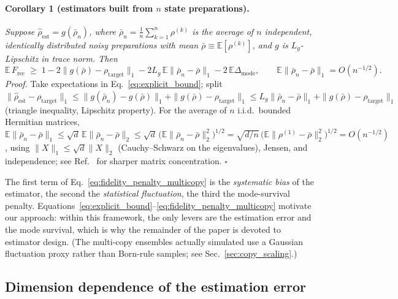 \documentclass[12pt,a4paper]{article}
\newcommand{\Frec}{F_\mathrm{rec}}
\newcommand{\rhot}{\rho_\mathrm{target}}
\newcommand{\rhoe}{\hat{\rho}_\mathrm{est}}
\begin{document}
\paragraph{Corollary 1 (estimators built from $n$ state preparations).}
\textit{Suppose $\rhoe = g(\bar\rho_n)$, where $\bar\rho_n = \tfrac1n\sum_{k=1}^n \rho^{(k)}$ is the average of $n$ independent, identically distributed noisy preparations with mean $\bar\rho \equiv \mathbb{E}[\rho^{(k)}]$, and $g$ is $L_g$-Lipschitz in trace norm. Then}
\begin{equation}
\mathbb{E}\,\Frec \;\geq\; 1 - 2\bigl\|g(\bar\rho) - \rhot\bigr\|_1 - 2L_g\,\mathbb{E}\|\bar\rho_n - \bar\rho\|_1 - 2\,\mathbb{E}\Delta_{\mathrm{mode}},
\qquad \mathbb{E}\|\bar\rho_n - \bar\rho\|_1 = O(n^{-1/2}).
\label{eq:fidelity_penalty_multicopy}
\end{equation}
\noindent\textit{Proof.}
Take expectations in Eq.~\eqref{eq:explicit_bound}; split $\|\rhoe - \rhot\|_1 \leq \|g(\bar\rho_n) - g(\bar\rho)\|_1 + \|g(\bar\rho) - \rhot\|_1 \leq L_g\|\bar\rho_n - \bar\rho\|_1 + \|g(\bar\rho) - \rhot\|_1$ (triangle inequality, Lipschitz property).
For the average of $n$ i.i.d.\ bounded Hermitian matrices, $\mathbb{E}\|\bar\rho_n - \bar\rho\|_1 \leq \sqrt{d}\,\mathbb{E}\|\bar\rho_n - \bar\rho\|_2 \leq \sqrt{d}\,\bigl(\mathbb{E}\|\bar\rho_n - \bar\rho\|_2^2\bigr)^{1/2} = \sqrt{d/n}\,\bigl(\mathbb{E}\|\rho^{(1)} - \bar\rho\|_2^2\bigr)^{1/2} = O(n^{-1/2})$, using $\|X\|_1 \leq \sqrt{d}\|X\|_2$ (Cauchy--Schwarz on the eigenvalues), Jensen, and independence; see Ref.~\cite[Sec.~1]{Tropp2015} for sharper matrix concentration. \hfill$\square$

The first term of Eq.~\eqref{eq:fidelity_penalty_multicopy} is the \emph{systematic bias} of the estimator, the second the \emph{statistical fluctuation}, the third the mode-survival penalty.
Equations~\eqref{eq:explicit_bound}--\eqref{eq:fidelity_penalty_multicopy} motivate our approach: within this framework, the only levers are the estimation error and the mode survival, which is why the remainder of the paper is devoted to estimator design.
(The multi-copy ensembles actually simulated use a Gaussian fluctuation proxy rather than Born-rule samples; see Sec.~\ref{sec:copy_scaling}.)

\subsection{Dimension dependence of the estimation error}
\label{sec:crossover_theory}
\end{document}
